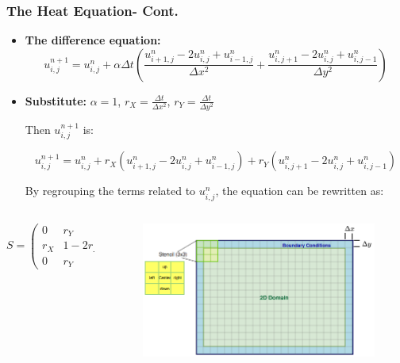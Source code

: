 \documentclass[9pt]{beamer}
\begin{document}
\begin{frame}
\vspace{-0.1\baselineskip} %

\frametitle{The Heat Equation- Cont.}
\scriptsize
\begin{itemize}
\item \textbf{The difference equation:}
\[
u_{i,j}^{n+1} = u_{i,j}^n + \alpha \Delta t \left( \frac{u_{i+1,j}^n - 2u_{i,j}^n + u_{i-1,j}^n}{\Delta x^2} + \frac{u_{i,j+1}^n - 2u_{i,j}^n + u_{i,j-1}^n}{\Delta y^2} \right)
\]
\item \textbf{Substitute:}
\vspace{0.3\baselineskip}
 \( \alpha = 1 \), \( r_X = \frac{\Delta t}{\Delta x^2} \), \( r_Y = \frac{\Delta t}{\Delta y^2} \)

Then \( u_{i,j}^{n+1} \) is:

\[
u_{i,j}^{n+1} = u_{i,j}^n + r_X \left( u_{i+1,j}^n - 2u_{i,j}^n + u_{i-1,j}^n \right) + r_Y \left( u_{i,j+1}^n - 2u_{i,j}^n + u_{i,j-1}^n \right)
\]

By regrouping the terms related to \( u_{i,j}^n \), the equation can be rewritten as:
\end{itemize}
\begin{columns}
\begin{column}{0.40\textwidth}
\[
S= \begin{pmatrix}
0   & r_{Y}   & 0 \\
r_{X}  & 1 - 2r_{X} - 2r_{Y}  & r_{X} \\
0   & r_{Y}   & 0
\end{pmatrix}
\]
\end{column}

\begin{column}{0.60\textwidth}
\begin{figure}
    \centering
    \includegraphics[width=0.95\linewidth]{Screenshot from 2024-09-30 14-37-35.png}
\end{figure}
\end{column}
\end{columns}
\end{frame}
\end{document}
